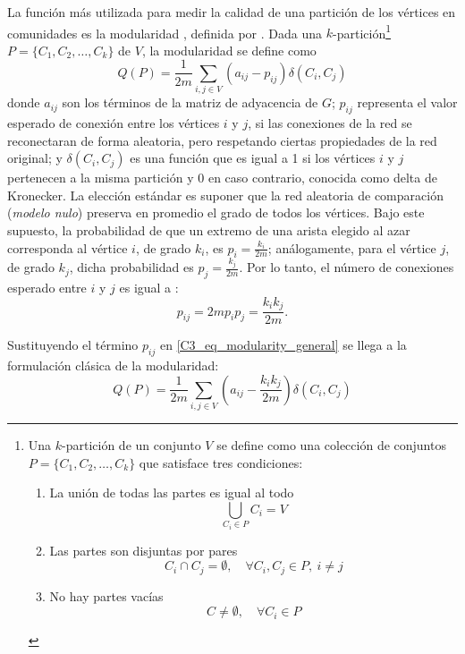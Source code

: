 La función más utilizada para medir la calidad de una partición de los vértices en comunidades es la modularidad \parencite[p.~29]{Fortunato2016},  definida por   \textcite{Newman2004}. Dada una $k$-partición\footnote{Una $k$-partición de un conjunto $V$ se define como una colección de conjuntos $P=\{C_1, C_2, \ldots, C_k\}$ que satisface tres condiciones:
	\begin{enumerate}
		\item La unión de todas las partes es igual al todo $$\bigcup_{C_i\in P}C_i=V$$
		\item Las partes son disjuntas por pares $$C_i \cap C_j =\emptyset, \quad \forall C_i,C_j\in P, \ i\neq j$$
		\item No hay partes vacías $$C\neq \emptyset, \quad \forall C_i\in P$$
\end{enumerate}} $P=\{C_1,C_2,\ldots,C_k\}$ de $V$, la modularidad se define como
\begin{equation}
    Q(P) = \frac{1}{2m}\sum_{i,j\in V} \left(a_{ij}-p_{ij}\right) \delta(C_i,C_j) \label{C3_eq_modularity_general}
\end{equation}
donde $a_{ij}$ son los términos de la matriz de adyacencia de $G$; $p_{ij}$ representa el valor esperado de conexión entre los vértices $i$ y $j$, si las conexiones de la red se reconectaran de forma aleatoria, pero respetando ciertas propiedades de la red original; y $\delta(C_i, C_j)$ es una función que es igual a 1 si los vértices $i$ y $j$ pertenecen a la misma partición y 0 en caso contrario, conocida como delta de Kronecker. La elección estándar es suponer que la red aleatoria de comparación (\textit{modelo nulo}) preserva en promedio el grado de todos los vértices. Bajo este supuesto, la probabilidad de que un extremo de una arista elegido al azar corresponda al vértice $i$, de grado $k_i$, es $p_i=\frac{k_i}{2m}$; análogamente, para el vértice $j$, de grado $k_j$, dicha probabilidad es $p_j=\frac{k_j}{2m}$. Por lo tanto, el número de conexiones esperado entre $i$ y $j$ es igual a \parencite[p.~29]{Fortunato2016}:
\begin{equation}
	p_{ij} = 2mp_ip_j = \frac{k_ik_j}{2m}.
\end{equation}

Sustituyendo el término $p_{ij}$ en \eqref{C3_eq_modularity_general} se llega a la formulación clásica de la modularidad:
\begin{equation}
	Q(P) = \frac{1}{2m}\sum_{i,j\in V} \left(a_{ij}-\frac{k_ik_j}{2m}\right) \delta(C_i,C_j) \label{C3_eq_modularity1}
\end{equation}

